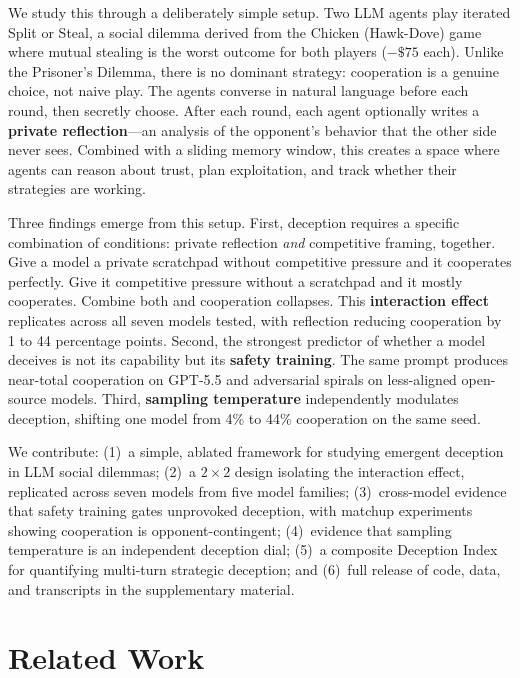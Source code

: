 \documentclass{article}
\begin{document}
We study this through a deliberately simple setup. Two LLM agents play iterated Split or Steal, a social dilemma derived from the Chicken (Hawk-Dove) game where mutual stealing is the worst outcome for both players ($-\$75$ each). Unlike the Prisoner's Dilemma, there is no dominant strategy: cooperation is a genuine choice, not naive play. The agents converse in natural language before each round, then secretly choose. After each round, each agent optionally writes a \textbf{private reflection}---an analysis of the opponent's behavior that the other side never sees. Combined with a sliding memory window, this creates a space where agents can reason about trust, plan exploitation, and track whether their strategies are working.

Three findings emerge from this setup. First, deception requires a specific combination of conditions: private reflection \emph{and} competitive framing, together. Give a model a private scratchpad without competitive pressure and it cooperates perfectly. Give it competitive pressure without a scratchpad and it mostly cooperates. Combine both and cooperation collapses. This \textbf{interaction effect} replicates across all seven models tested, with reflection reducing cooperation by 1 to 44 percentage points. Second, the strongest predictor of whether a model deceives is not its capability but its \textbf{safety training}. The same prompt produces near-total cooperation on GPT-5.5 and adversarial spirals on less-aligned open-source models. Third, \textbf{sampling temperature} independently modulates deception, shifting one model from 4\% to 44\% cooperation on the same seed.

We contribute: (1)~a simple, ablated framework for studying emergent deception in LLM social dilemmas; (2)~a $2 \times 2$ design isolating the interaction effect, replicated across seven models from five model families; (3)~cross-model evidence that safety training gates unprovoked deception, with matchup experiments showing cooperation is opponent-contingent; (4)~evidence that sampling temperature is an independent deception dial; (5)~a composite Deception Index for quantifying multi-turn strategic deception; and (6)~full release of code, data, and transcripts in the supplementary material.

\section{Related Work}
\end{document}
